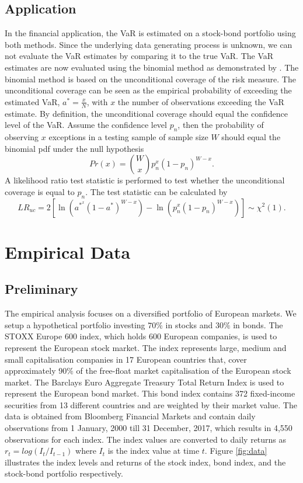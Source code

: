 \documentclass[a4paper,12pt]{article}
\theoremstyle{plain}
\begin{document}
\subsection{Application}
In the financial application, the VaR is estimated on a stock-bond portfolio using both methods. Since the underlying data generating process is unknown, we can not evaluate the VaR estimates by comparing it to the true VaR. The VaR estimates are now evaluated using the binomial method as demonstrated by . The binomial method is based on the unconditional coverage of the risk measure. The unconditional coverage can be seen as the empirical probability of exceeding the estimated VaR, $a^*=\frac{x}{N}$, with $x$ the number of observations exceeding the VaR estimate. By definition, the unconditional coverage should equal the confidence level of the VaR. Assume the confidence level $p_n$, then the probability of observing $x$ exceptions in a testing sample of sample size $W$ should equal the binomial pdf under the null hypothesis \begin{equation}
    Pr\left(x\right) = {W\choose x}p_n^x\left(1-p_n\right)^{W-x}.
\end{equation}
\noindent A likelihood ratio test statistic is performed to test whether the unconditional coverage is equal to $p_n$. The test statistic can be calculated by
\begin{equation}
    LR_{uc} = 2\left[\ln{\left(a^{*^x}\left(1-a^*\right)^{W-x}\right)}-\ln{\left(p_n^x\left(1-p_n\right)^{W-x}\right)}\right]\sim \chi^2\left(1\right).
\end{equation}

\newpage
\section{Empirical Data}
\subsection{Preliminary}
The empirical analysis focuses on a diversified portfolio of European markets. We setup a hypothetical portfolio investing $70\%$ in stocks and $30\%$ in bonds. The STOXX Europe 600 index, which holds 600 European companies, is used to represent the European stock market. The index represents large, medium and small capitalisation companies in 17 European countries that, cover approximately 90$\%$ of the free-float market capitalisation of the European stock market. The Barclays Euro Aggregate Treasury Total Return Index is used to represent the European bond market. This bond index contains 372 fixed-income securities from 13 different countries and are weighted by their market value. The data is obtained from Bloomberg Financial Markets and contain daily observations from 1 January, 2000 till 31 December, 2017, which results in 4,550 observations for each index. The index values are converted to daily returns as $r_t = log(I_t/I_{t-1})$ where $I_t$ is the index value at time $t$. Figure \ref{fig:data} illustrates the index levels and returns of the stock index, bond index, and the stock-bond portfolio respectively. 
\end{document}
